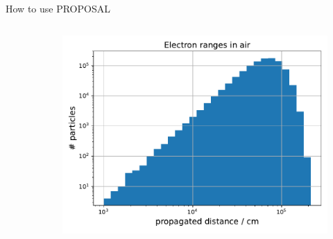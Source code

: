 \documentclass[t]{beamer}
\begin{document}
\begin{columns}[onlytextwidth]
\begin{column}{0.55\textwidth}
\begin{block}[equal height group=F]{How to use PROPOSAL}
\begin{columns}[onlytextwidth]
\begin{column}{0.48\textwidth}
          \end{column}
          \begin{column}{0.07\textwidth}
          \begin{center}
            \vspace{7.5em}
          \end{center}          
        \end{column}
          \begin{column}{0.45\textwidth}
            \vspace{-1.0cm}
            \begin{figure}
              \includegraphics[width=\linewidth, height=.4\textheight, keepaspectratio]{code/example_output.pdf}
            \end{figure}
          \end{column}
        \end{columns}
 

\end{block}
\end{column}
\end{columns}
\end{document}
